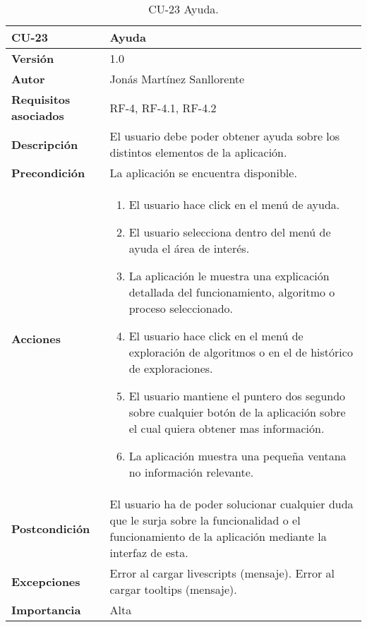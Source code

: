 \begin{table}[p]
	\centering
	\begin{tabularx}{\linewidth}{ p{} p{} }
		\toprule
		\textbf{CU-23}    & \textbf{Ayuda}\\
		\toprule
		\textbf{Versión}              & 1.0    \\
		\textbf{Autor}                & Jonás Martínez Sanllorente \\
		\textbf{Requisitos asociados} & RF-4, RF-4.1, RF-4.2 \\
		\textbf{Descripción}          & El usuario debe poder obtener ayuda sobre los distintos elementos de la aplicación. \\
		\textbf{Precondición}         & La aplicación se encuentra disponible. \\
		\textbf{Acciones}             &
		\begin{enumerate}
			\def\labelenumi{\arabic{enumi}.}
			\tightlist
			\item El usuario hace click en el menú de ayuda.
			\item El usuario selecciona dentro del menú de ayuda el área de interés.
            \item La aplicación le muestra una explicación detallada del funcionamiento, algoritmo o proceso seleccionado.
            \item El usuario hace click en el menú de exploración de algoritmos o en el de histórico de exploraciones.
            \item El usuario mantiene el puntero dos segundo sobre cualquier botón de la aplicación sobre el cual quiera obtener mas información.
            \item La aplicación muestra una pequeña ventana no información relevante.
		\end{enumerate}\\
		\textbf{Postcondición}        & El usuario ha de poder solucionar cualquier duda que le surja sobre la funcionalidad o el funcionamiento de la aplicación mediante la interfaz de esta. \\
		\textbf{Excepciones}          & Error al cargar livescripts (mensaje).\newline
                                        Error al cargar tooltips (mensaje).\\
		\textbf{Importancia}          & Alta \\
		\bottomrule
	\end{tabularx}
	\caption{CU-23 Ayuda.}
\end{table}

